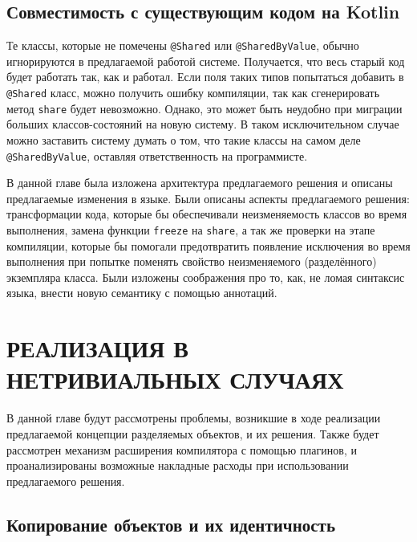 \documentclass[specification,annotation,times]{itmo-student-thesis}
\newcommand{\todo}[1]{\textbf{TODO}} %
\begin{document}
\section{Совместимость с существующим кодом на Kotlin}\label{backwards_compat}

Те классы, которые не помечены \texttt{@Shared} или \texttt{@SharedByValue}, обычно игнорируются в предлагаемой работой системе.
Получается, что весь старый код будет работать так, как и работал.
Если поля таких типов попытаться добавить в \texttt{@Shared} класс, можно получить ошибку компиляции, так как сгенерировать метод \texttt{share} будет невозможно.
Однако, это может быть неудобно при миграции больших классов-состояний на новую систему.
В таком исключительном случае можно заставить систему думать о том, что такие классы на самом деле \texttt{@SharedByValue}, оставляя ответственность на программисте.
\chapterconclusion

В данной главе была изложена архитектура предлагаемого решения и описаны предлагаемые изменения в языке.
Были описаны аспекты предлагаемого решения: трансформации кода, которые бы обеспечивали неизменяемость классов во время выполнения, замена функции \texttt{freeze} на \texttt{share}, а так же проверки на этапе компиляции, которые бы помогали предотвратить появление исключения во время выполнения при попытке поменять свойство неизменяемого (разделённого) экземпляра класса.
Были изложены соображения про то, как, не ломая синтаксис языка, внести новую семантику с помощью аннотаций.

\chapter{РЕАЛИЗАЦИЯ В НЕТРИВИАЛЬНЫХ СЛУЧАЯХ}

В данной главе будут рассмотрены проблемы, возникшие в ходе реализации предлагаемой концепции разделяемых объектов, и их решения.
Также будет рассмотрен механизм расширения компилятора с помощью плагинов, и проанализированы возможные накладные расходы при использовании предлагаемого решения.



\section{Копирование объектов и их идентичность}
\end{document}
